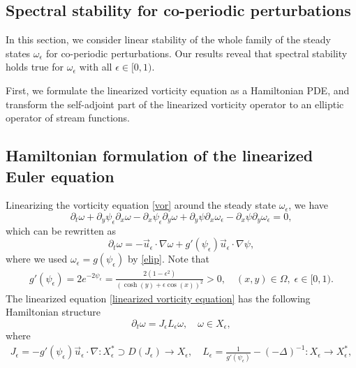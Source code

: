 \documentclass[1 [leqno, 11pt]{amsart}
\numberwithin{equation}{section}
\let\ep=\epsilon
\begin{document}
\begin{CJK*}{GBK}{song}
\section{Spectral stability for  co-periodic perturbations}\label{co-periodic-linear}

In this section, we consider  linear stability of the whole family of the steady states $\omega_\ep$ for co-periodic  perturbations. Our results reveal that spectral stability  holds true  for $\omega_\ep$ with  all $\ep \in [0, 1)$.

First, we  formulate the linearized vorticity  equation as a Hamiltonian PDE, and transform the self-adjoint part of the  linearized vorticity operator to an   elliptic operator of stream functions.
\subsection{Hamiltonian formulation of the linearized Euler equation}
Linearizing the vorticity equation \eqref{vor} around the steady state $\omega_\ep$, we have
 \begin{equation*}
 \partial_t \omega + \partial_y \psi_{\epsilon} \partial_x \omega - \partial_x \psi_{\epsilon}\partial_y \omega + \partial_y \psi \partial_x \omega_\epsilon - \partial_x\psi\partial_y \omega_\epsilon = 0,
 \end{equation*}
 which can be rewritten as
 \begin{equation}\label{linearized vorticity equation}
 \partial_t\omega = - \vec{u}_\epsilon\cdot \nabla\omega + g'(\psi_\epsilon)\vec{u}_\epsilon\cdot\nabla\psi,
 \end{equation}
 where we used $\omega_\epsilon=g(\psi_\epsilon)$ by \eqref{elip}. Note that
  \begin{align}\label{def-g-psi-ep-derivative}
    g'(\psi_\epsilon) = 2 e^{-2\psi_\epsilon} = \frac{2(1-\ep^2)}{(\cosh (y) + \ep \cos(x))^2}>0,\quad(x,y)\in\Omega,\; \epsilon\in[0,1).
  \end{align}
   The linearized equation \eqref{linearized vorticity equation} has
 the following  Hamiltonian structure
 \begin{equation*}
 \partial_t \omega = J_\epsilon L_\epsilon\omega, \quad \omega \in X_\ep,
 \end{equation*}
 where
 \begin{align*}J_\epsilon = -g'(\psi_\epsilon)\vec{u}_\epsilon\cdot\nabla: X_\ep^* \supset D(J_\epsilon) \rightarrow X_\ep, \quad
 L_\epsilon = \frac {1} {g'(\psi_\epsilon)} - (-\Delta)^{-1}: X_\ep \rightarrow X_\ep^*,\end{align*}

\end{CJK*}
\end{document}
